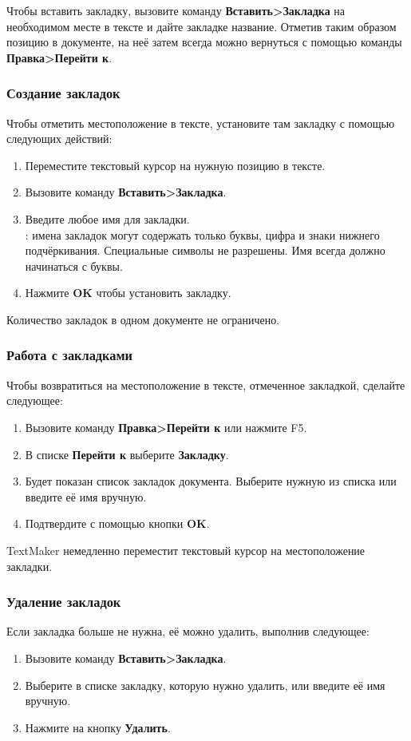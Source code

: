 \documentclass[a4paper,10pt]{article}
\begin{document}
Чтобы вставить закладку, вызовите команду \textbf{Вставить>Закладка} на необходимом месте в тексте и дайте закладке название. Отметив таким образом позицию в документе, на неё затем всегда можно вернуться с помощью команды \textbf{Правка>Перейти к}.

\subsubsection{Создание закладок}
Чтобы отметить местоположение в тексте, установите там закладку с помощью следующих действий:
\begin{enumerate}
 \item Переместите текстовый курсор на нужную позицию в тексте.
 \item Вызовите команду \textbf{Вставить>Закладка}.
 \item Введите любое имя для закладки.\\
 {: имена закладок могут содержать только буквы, цифра и знаки нижнего подчёркивания. Специальные символы не разрешены. Имя всегда должно начинаться с буквы.}
 \item Нажмите \textbf{OK} чтобы установить закладку.
\end{enumerate}

Количество закладок в одном документе не ограничено.

\subsubsection{Работа с закладками}
Чтобы возвратиться на местоположение в тексте, отмеченное закладкой, сделайте следующее:
\begin{enumerate}
 \item Вызовите команду \textbf{Правка>Перейти к} или нажмите F5.
 \item В списке \textbf{Перейти к } выберите \textbf{Закладку}.
 \item Будет показан список закладок документа. Выберите нужную из списка или введите её имя вручную.
 \item Подтвердите с помощью кнопки \textbf{OK}.
\end{enumerate}

TextMaker немедленно переместит текстовый курсор на местоположение закладки.

\subsubsection{Удаление закладок}
Если закладка больше не нужна, её можно удалить, выполнив следующее:
\begin{enumerate}
 \item Вызовите команду \textbf{Вставить>Закладка}.
 \item Выберите в списке закладку, которую нужно удалить, или введите её имя вручную.
 \item Нажмите на кнопку \textbf{Удалить}.
\end{enumerate}
\end{document}
